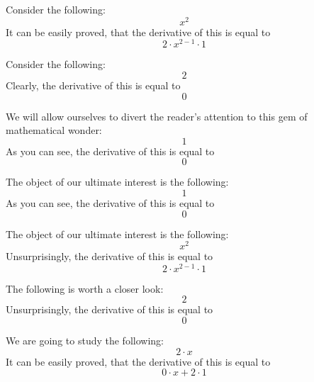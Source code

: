 \documentclass{article}
\begin{document}
Consider the following:
\begin{equation}
x ^{2 } 
\end{equation}
It can be easily proved, that the derivative of this is equal to
\begin{equation}
2 \cdot x ^{2 - 1 } \cdot 1 
\end{equation}

Consider the following:
\begin{equation}
2 
\end{equation}
Clearly, the derivative of this is equal to
\begin{equation}
0 
\end{equation}

We will allow ourselves to divert the reader's attention to this gem of mathematical wonder:
\begin{equation}
1 
\end{equation}
As you can see, the derivative of this is equal to
\begin{equation}
0 
\end{equation}

The object of our ultimate interest is the following:
\begin{equation}
1 
\end{equation}
As you can see, the derivative of this is equal to
\begin{equation}
0 
\end{equation}

The object of our ultimate interest is the following:
\begin{equation}
x ^{2 } 
\end{equation}
Unsurprisingly, the derivative of this is equal to
\begin{equation}
2 \cdot x ^{2 - 1 } \cdot 1 
\end{equation}

The following is worth a closer look:
\begin{equation}
2 
\end{equation}
Unsurprisingly, the derivative of this is equal to
\begin{equation}
0 
\end{equation}

We are going to study the following:
\begin{equation}
2 \cdot x 
\end{equation}
It can be easily proved, that the derivative of this is equal to
\begin{equation}
0 \cdot x + 2 \cdot 1 
\end{equation}
\end{document}
